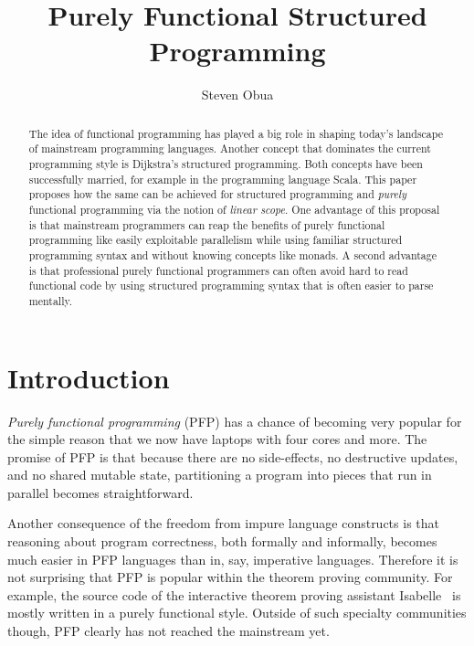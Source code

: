 \documentclass{llncs}
\begin{document}
\title{Purely Functional Structured Programming}

\author{Steven Obua}
\institute{}
\date{}


\maketitle

\begin{abstract}
The idea of functional programming has played a big role in shaping today's landscape of mainstream programming languages. 
Another concept that dominates the current programming style is Dijkstra's structured programming. Both concepts have been successfully married, for example in the programming language Scala. This paper proposes how the same can be achieved for structured programming and \emph{purely} functional programming via the notion of \emph{linear scope}. 
One advantage of this proposal is that mainstream programmers can reap the benefits of purely functional programming like easily exploitable parallelism  while using familiar structured programming syntax and without knowing concepts like monads. A second advantage is that professional purely functional programmers can often avoid hard to read functional code by using structured programming syntax that is often easier to parse mentally.
\end{abstract}

\section{Introduction}
\emph{Purely functional programming} (PFP) has a chance of becoming very popular for the simple reason that we now have laptops with four cores and more. The promise of PFP is that because there are no side-effects, no destructive updates, and no shared mutable state, partitioning a program into pieces that run in parallel becomes straightforward. 

Another consequence of the freedom from impure language constructs is that reasoning about program correctness, both formally and informally, becomes much easier in PFP languages than in, say, imperative languages. Therefore it is not surprising that PFP is popular within the theorem proving community.  For example, the source code of the interactive theorem proving assistant Isabelle~\cite{isabelle} is mostly written in a purely functional style. Outside of such specialty communities though, PFP clearly has not reached the mainstream yet. 
\end{document}
